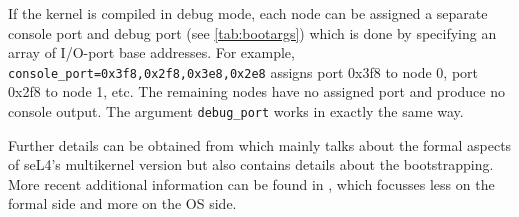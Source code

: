 If the kernel is compiled in debug mode, each node can be assigned a separate
console port and debug port (see \autoref{tab:bootargs}) which is done by
specifying an array of I/O-port base addresses. For example,
\texttt{console\_port=0x3f8,0x2f8,0x3e8,0x2e8}
assigns port 0x3f8 to node 0, port 0x2f8 to node 1, etc. The remaining nodes
have no assigned port and produce no console output. The argument
\texttt{debug\_port} works in exactly the same way.

Further details can be obtained from \cite{vonTessin_10} which mainly talks
about the formal aspects of seL4's multikernel version but also contains
details about the bootstrapping. More recent additional information can be
found in \cite{vonTessin_12}, which focusses less on the formal side
and more on the OS side.
\fi
